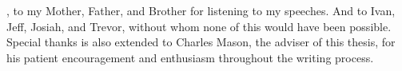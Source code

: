 
, to my Mother, Father, and Brother for listening to my speeches. And to Ivan, Jeff, Josiah, and Trevor, without whom none of this would have been possible. Special thanks is also extended to Charles Mason, the adviser of this thesis, for his patient encouragement and enthusiasm throughout the writing process.